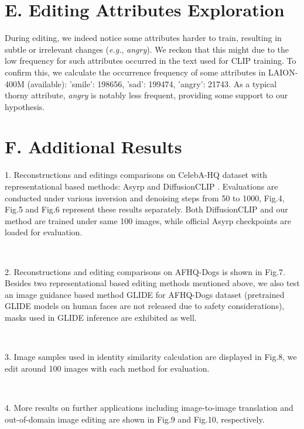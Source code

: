 \documentclass[letterpaper]{article} %
\begin{document}
\section{E. Editing Attributes Exploration}

During editing, we indeed notice some attributes  harder to train, resulting in subtle or irrelevant changes (\textit{e.g.}, \textit{angry}). We reckon that this might due to the low frequency for such attributes occurred in the text used for CLIP training. To confirm this, we calculate the occurrence frequency of some attributes in LAION-400M (available): 'smile': 198656, 'sad': 199474, 'angry': 21743. As a typical thorny attribute, \textit{angry} is notably less frequent, providing some support to our hypothesis. 


\section{F. Additional Results}

1. Reconstructions and editings comparisons on CelebA-HQ dataset \cite{karras2017progressive} with representational based methods: Asyrp \cite{kwon2022diffusion} and DiffusionCLIP \cite{kim2022diffusionclip}. Evaluations are conducted under various inversion and denoising steps from 50 to 1000, Fig.4, Fig.5 and Fig.6 represent these results separately. Both DiffusionCLIP and our method are trained under same 100 images, while official Asyrp checkpoints are loaded for evaluation.

~\

2.  Reconstructions and editing comparisons on AFHQ-Dogs \cite{choi2020stargan} is shown in Fig.7. Besides two representational based editing methods mentioned above, we also test an image guidance based method GLIDE \cite{nichol2021glide} for AFHQ-Dogs dataset (pretrained GLIDE models on human faces are not released due to safety considerations), masks used in GLIDE inference are exhibited as well. 

~\

3. Image samples used in identity similarity calculation are displayed in Fig.8, we edit around 100 images with each method for evaluation.

~\

4. More results on further applications including image-to-image translation and out-of-domain image editing are shown in Fig.9 and Fig.10, respectively.
\end{document}
